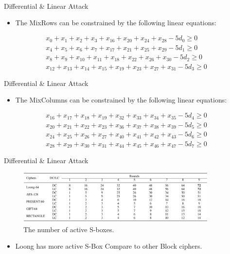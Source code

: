 \begin{frame}{Differential \& Linear Attack}
    \begin{itemize}
         \item  The MixRows can be constrained by the following linear equations:
    \end{itemize}
    \begin{gather}
        x_0+x_1+x_2+x_3+x_{16}+x_{20}+x_{24}+x_{28}-5d_0 \ge0\\
        x_4+x_5+x_6+x_7+x_{17}+x_{21}+x_{25}+x_{29}-5d_1\ge0\\
        x_8+x_9+x_{10}+x_{11}+x_{18}+x_{22}+x_{26}+x_{30}-5d_2\ge0\\
        x_{12}+x_{13}+x_{14}+x_{15}+x_{19}+x_{23}+x_{27}+x_{31}-5d_3\ge0
    \end{gather}
\end{frame}

\begin{frame}{Differential \& Linear Attack}
    \begin{itemize}
         \item  The MixColumns can be constrained by the following linear equations: 
    \end{itemize}
    \begin{gather}
        x_{16}+x_{17}+x_{18}+x_{19}+x_{32}+x_{33}+x_{34}+x_{35}-5d_4\ge0\\
        x_{20}+x_{21}+x_{22}+x_{23}+x_{36}+x_{37}+x_{38}+x_{39}-5d_5\ge0\\
        x_{24}+x_{25}+x_{26}+x_{27}+x_{40}+x_{41}+x_{42}+x_{43}-5d_6\ge0\\
        x_{28}+x_{29}+x_{30}+x_{31}+x_{44}+x_{45}+x_{46}+x_{47}-5d_7\ge0
    \end{gather}

\end{frame}

\begin{frame}{Differential \& Linear Attack}
    \begin{figure}[htp]
        \centering
        \includegraphics[width=10cm]{a1f.png}
        \caption{The number of active S-boxes.}
    \end{figure}
    \begin{itemize}
    \pause
         \item Loong has more active S-Box Compare to other Block ciphers.
    \end{itemize}
\end{frame}

